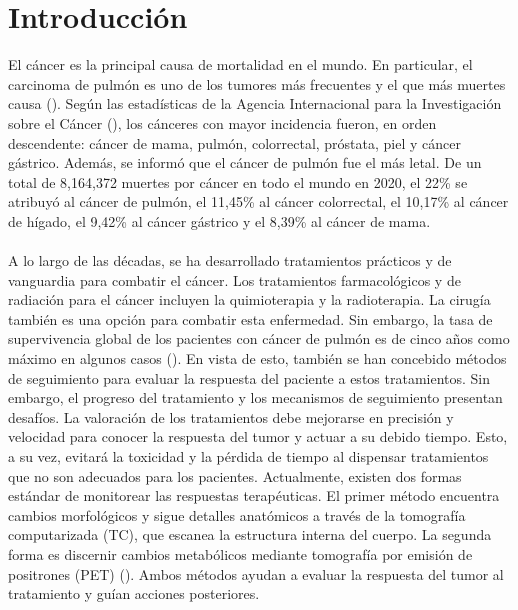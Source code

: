 \documentclass[11pt,a4paper,openany]{article}
\begin{document}
\section{Introducción}
El cáncer es la principal causa de mortalidad en el mundo. En particular, el carcinoma de pulmón es uno de los tumores más frecuentes y el que más muertes causa (\cite{Xu2019}). Según las estadísticas de la Agencia Internacional para la Investigación sobre el Cáncer (\cite{ferlay_global_2024}), los cánceres con mayor incidencia fueron, en orden descendente: cáncer de mama, pulmón, colorrectal, próstata, piel y cáncer gástrico. Además, se informó que el cáncer de pulmón fue el más letal. De un total de 8,164,372 muertes por cáncer en todo el mundo en 2020, el 22\% se atribuyó al cáncer de pulmón, el 11,45\% al cáncer colorrectal, el 10,17\% al cáncer de hígado, el 9,42\% al cáncer gástrico y el 8,39\% al cáncer de mama.\\
\\
A lo largo de las décadas, se ha desarrollado tratamientos prácticos y de vanguardia para combatir el cáncer. Los tratamientos farmacológicos y de radiación para el cáncer incluyen la quimioterapia y la radioterapia. La cirugía también es una opción para combatir esta enfermedad. Sin embargo, la tasa de supervivencia global de los pacientes con cáncer de pulmón es de cinco años como máximo en algunos casos (\cite{Bianconi2020}). En vista de esto, también se han concebido métodos de seguimiento para evaluar la respuesta del paciente a estos tratamientos. Sin embargo, el progreso del tratamiento y los mecanismos de seguimiento presentan desafíos. La valoración de los tratamientos debe mejorarse en precisión y velocidad para conocer la respuesta del tumor y actuar a su debido tiempo. Esto, a su vez, evitará la toxicidad y la pérdida de tiempo al dispensar tratamientos que no son adecuados para los pacientes. Actualmente, existen dos formas estándar de monitorear las respuestas terapéuticas. El primer método encuentra cambios morfológicos y sigue detalles anatómicos a través de la tomografía computarizada (TC), que escanea la estructura interna del cuerpo. La segunda forma es discernir cambios metabólicos mediante tomografía por emisión de positrones (PET) (\cite{Shang2016}). Ambos métodos ayudan a evaluar la respuesta del tumor al tratamiento y guían acciones posteriores.\\
\end{document}
